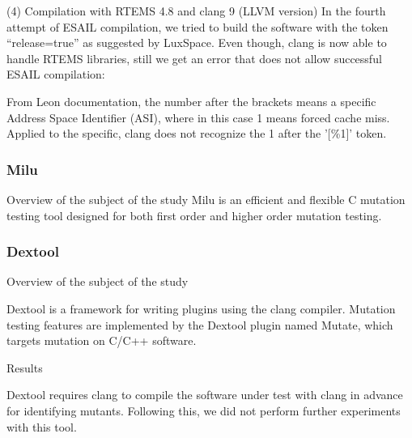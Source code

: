 (4) Compilation with RTEMS 4.8 and clang 9 (LLVM version)
In the fourth attempt of ESAIL compilation, we tried to build the software with the token “release=true” as suggested by LuxSpace. Even though, clang is now able to handle RTEMS libraries, still we get an error that does not allow successful ESAIL compilation:

From Leon documentation, the number after the brackets means a specific Address Space Identifier (ASI), where in this case 1 means forced cache miss. Applied to the specific, clang does not recognize the 1 after the '[\%1]' token.


\subsubsection{Milu}

Overview of the subject of the study
Milu is an efficient and flexible C mutation testing tool designed for both first order and higher order mutation testing.


\subsubsection{Dextool}

Overview of the subject of the study

Dextool is a framework for writing plugins using the clang compiler. Mutation testing features are implemented by the Dextool plugin named Mutate, which targets mutation on C/C++ software.

Results

Dextool requires clang to compile the software under test with clang in advance for identifying mutants. Following this, we did not perform further experiments with this tool.




